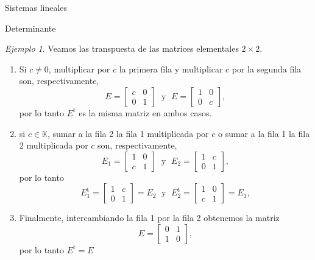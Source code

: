 \documentclass[a4paper,12pt,twoside,spanish,reqno]{amsbook}
\numberwithin{equation}{section}
\theoremstyle{definition}
\theoremstyle{remark}
\newtheorem*{ejemplo*}{Ejemplo}
\renewcommand{\t}{{\operatorname{t}}}
\newcommand{\K}{\mathbb K}
\begin{document}
\begin{chapter}{Sistemas lineales}
\begin{section}{Determinante}
    \begin{ejemplo*} Veamos las transpuesta de las matrices elementales  $2 \times 2$.
        \begin{enumerate}
            \item Si $c \not=0$, multiplicar por  $c$ la primera fila y multiplicar $c$ por la segunda fila son, respectivamente,
            \begin{equation*}
            E = \begin{bmatrix} c& 0\\ 0&1\end{bmatrix}\;\text{ y }\; E = \begin{bmatrix} 1& 0\\ 0&c\end{bmatrix},
            \end{equation*}
            por lo tanto $E^\t$ es la misma matriz en ambos casos. 
            \item si  $c \in \K$, sumar a la fila 2 la fila 1 multiplicada por $c$ o sumar a la fila 1 la fila 2 multiplicada por $c$ son, respectivamente,
            \begin{equation*}
            E_1 = \begin{bmatrix} 1& 0\\ c&1\end{bmatrix}\;\text{ y }\; E_2 = \begin{bmatrix} 1& c\\ 0&1\end{bmatrix},
            \end{equation*}
            por lo tanto 
            \begin{equation*}
            E_1^\t = \begin{bmatrix} 1& c\\ 0&1\end{bmatrix} = E_2 \;\text{ y }\; E_2^\t = \begin{bmatrix} 1& 0\\ c&1\end{bmatrix} =E_1,
            \end{equation*}
            \item Finalmente, intercambiando la fila 1 por la fila 2 obtenemos la matriz
            \begin{equation*}
            E = \begin{bmatrix} 0& 1\\ 1&0\end{bmatrix},
            \end{equation*}
            por lo tanto $E^\t =E$
        \end{enumerate}
    \end{ejemplo*}
    


\end{section}
\end{chapter}
\end{document}
